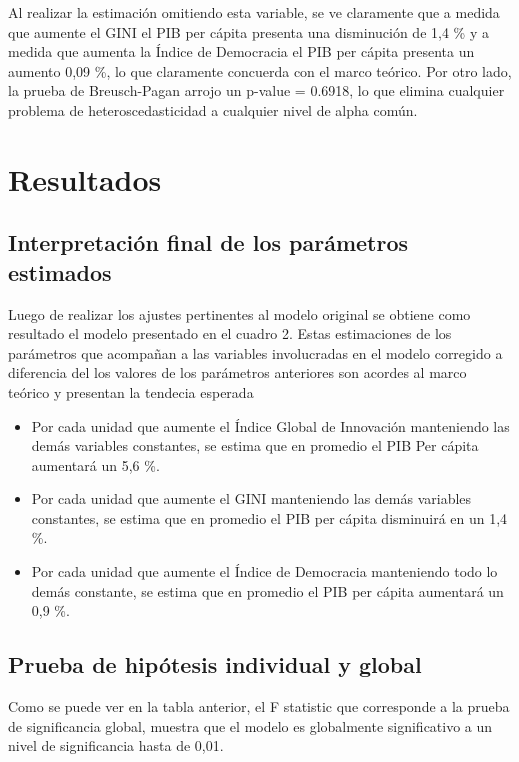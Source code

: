 \documentclass[11pt]{article}
\begin{document}
{Al realizar la estimación omitiendo esta variable, se ve claramente que a medida que aumente el GINI el PIB per cápita presenta una disminución de 1,4 \% y a medida que aumenta la Índice de Democracia el PIB per cápita presenta un aumento 0,09 \%, lo que claramente concuerda con el marco teórico. Por otro lado, la prueba de Breusch-Pagan arrojo un p-value = 0.6918, lo que elimina cualquier problema de heteroscedasticidad a cualquier nivel de alpha común.

\section{Resultados}

 \subsection{Interpretación final de los parámetros estimados}

 Luego de realizar los ajustes pertinentes al modelo original se obtiene como resultado el modelo presentado en el cuadro 2. Estas estimaciones de los parámetros que acompañan a las variables involucradas en el modelo corregido a diferencia del los valores de los parámetros anteriores son acordes al marco teórico y presentan la tendecia esperada

\begin{itemize}
    \item Por cada unidad que aumente el Índice Global de Innovación manteniendo las demás variables constantes, se estima que en promedio el PIB Per cápita aumentará un 5,6 \%.

    \item Por cada unidad que aumente el GINI manteniendo las demás variables constantes, se estima que en promedio el PIB per cápita disminuirá en un 1,4 \%.

    \item Por cada unidad que aumente el Índice de Democracia manteniendo todo lo demás constante, se estima que en promedio el PIB per cápita aumentará un 0,9 \%.

    
    \end{itemize}
 

\subsection{Prueba de hipótesis individual y global}

Como se puede ver en la tabla anterior, el F statistic que corresponde a la prueba de significancia global, muestra que el modelo es globalmente significativo a un nivel de significancia hasta de 0,01. 

}
\end{document}
